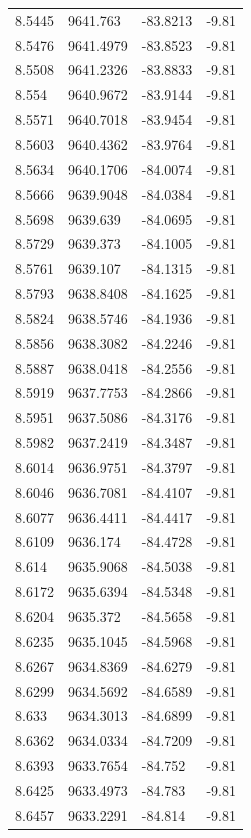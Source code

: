 \begin{table}[H]
\begin{tabular}{llll}
8.5445 & 9641.763 & -83.8213 & -9.81 \\
8.5476 & 9641.4979 & -83.8523 & -9.81 \\
8.5508 & 9641.2326 & -83.8833 & -9.81 \\
8.554 & 9640.9672 & -83.9144 & -9.81 \\
8.5571 & 9640.7018 & -83.9454 & -9.81 \\
8.5603 & 9640.4362 & -83.9764 & -9.81 \\
8.5634 & 9640.1706 & -84.0074 & -9.81 \\
8.5666 & 9639.9048 & -84.0384 & -9.81 \\
8.5698 & 9639.639 & -84.0695 & -9.81 \\
8.5729 & 9639.373 & -84.1005 & -9.81 \\
8.5761 & 9639.107 & -84.1315 & -9.81 \\
8.5793 & 9638.8408 & -84.1625 & -9.81 \\
8.5824 & 9638.5746 & -84.1936 & -9.81 \\
8.5856 & 9638.3082 & -84.2246 & -9.81 \\
8.5887 & 9638.0418 & -84.2556 & -9.81 \\
8.5919 & 9637.7753 & -84.2866 & -9.81 \\
8.5951 & 9637.5086 & -84.3176 & -9.81 \\
8.5982 & 9637.2419 & -84.3487 & -9.81 \\
8.6014 & 9636.9751 & -84.3797 & -9.81 \\
8.6046 & 9636.7081 & -84.4107 & -9.81 \\
8.6077 & 9636.4411 & -84.4417 & -9.81 \\
8.6109 & 9636.174 & -84.4728 & -9.81 \\
8.614 & 9635.9068 & -84.5038 & -9.81 \\
8.6172 & 9635.6394 & -84.5348 & -9.81 \\
8.6204 & 9635.372 & -84.5658 & -9.81 \\
8.6235 & 9635.1045 & -84.5968 & -9.81 \\
8.6267 & 9634.8369 & -84.6279 & -9.81 \\
8.6299 & 9634.5692 & -84.6589 & -9.81 \\
8.633 & 9634.3013 & -84.6899 & -9.81 \\
8.6362 & 9634.0334 & -84.7209 & -9.81 \\
8.6393 & 9633.7654 & -84.752 & -9.81 \\
8.6425 & 9633.4973 & -84.783 & -9.81 \\
8.6457 & 9633.2291 & -84.814 & -9.81 \\

\end{tabular}
\end{table}
